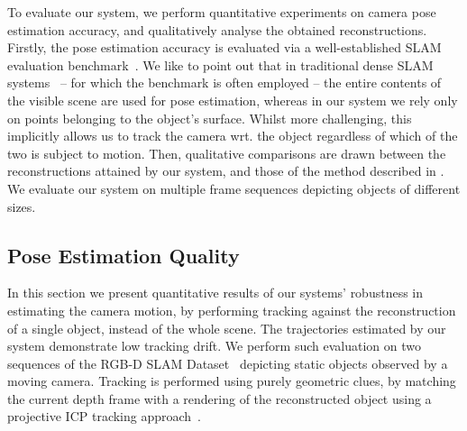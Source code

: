 To evaluate our system, we perform quantitative experiments on camera pose estimation accuracy, and qualitatively analyse the obtained reconstructions.
Firstly, the pose estimation accuracy is evaluated via a well-established SLAM evaluation benchmark~\cite{sturm12iros}.
We like to point out that %
in traditional dense SLAM systems~\cite{Prisacariu2014,Niessner2013,Newcombe2011} -- for which the benchmark is often employed -- the entire contents of the visible scene are used for pose estimation, whereas in our system we rely only on points belonging to the object's surface.
Whilst more challenging, this implicitly allows us to track the camera wrt. the object regardless of which of the two is subject to motion.
Then, qualitative comparisons are drawn between the reconstructions attained by our system, and those of the method described in \cite{Ren2013}.
We evaluate our system on multiple frame sequences depicting objects of different sizes. %

\vspace{-.7\baselineskip}

\subsection{Pose Estimation Quality}
In this section we present quantitative results of our systems' %
robustness in estimating the camera motion, by performing tracking against the reconstruction of a single object, instead of the whole scene.
The trajectories estimated by our system demonstrate low tracking drift. %
We perform such evaluation on two sequences of the RGB-D SLAM Dataset~\cite{sturm12iros} depicting static objects observed by a moving camera.
Tracking is performed using purely geometric clues, by matching the current depth frame with a rendering of the reconstructed object using a projective ICP tracking approach~\cite{Kahler2016}.


